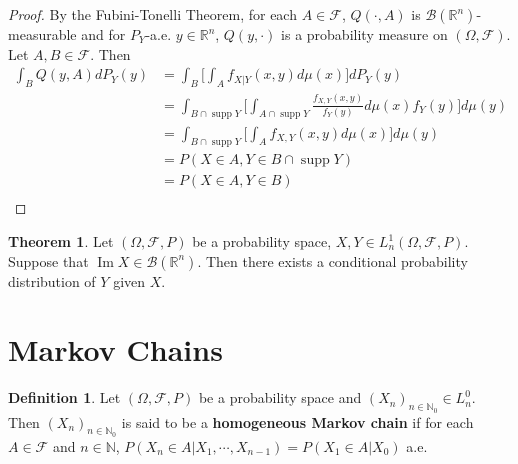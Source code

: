 \documentclass[12pt]{amsart}
\theoremstyle{definition}
\newtheorem{defn}[definition]{Definition}
\newtheorem{thm}[definition]{Theorem}
\newcommand{\Om}{\Omega}
\newcommand{\N}{\mathbb{N}}
\newcommand{\R}{\mathbb{R}}
\newcommand{\MB}{\mathcal{B}}
\newcommand{\MF}{\mathcal{F}}
\DeclareMathOperator{\Img}{Im}
\DeclareMathOperator{\supp}{supp}
\begin{document}
	\begin{proof}
	By the Fubini-Tonelli Theorem, for each $A \in \MF$, $Q(\cdot, A)$ is $\MB(\R^n)$-measurable and for $P_Y$-a.e. $y \in \R^n$, $Q(y, \cdot)$ is a probability measure on $(\Om, \MF)$. Let $A, B \in \MF$. Then 
	\begin{align*}
	\int_B Q(y, A) dP_Y(y)
	&= \int_B \bigg[ \int_A f_{X|Y}(x,y) d\mu(x) \bigg] dP_Y(y) \\
	&= \int_{B \cap \supp Y} \bigg[ \int_{A \cap \supp Y} \frac{f_{X,Y}(x,y)}{f_Y(y)} d\mu(x) f_Y(y) \bigg] d \mu(y) \\
	&= \int_{B \cap \supp Y}  \bigg[\int_A f_{X,Y}(x,y) d\mu(x) \bigg] d \mu(y) \\
	&= P(X \in A, Y \in B \cap \supp Y) \\
	&= P(X \in A, Y \in B) \\	
	\end{align*}
	\end{proof}
	
	\begin{thm}
	Let $(\Om, \MF, P)$ be a probability space, $X,Y \in L_n^1(\Om, \MF, P)$. Suppose that $\Img X \in \MB(\R^n)$. Then there exists a conditional probability distribution of $Y$ given $X$. 
	\end{thm}
	
	
	
	
	
	
	
	
	
	
	
	
	
	
	\newpage
	\section{Markov Chains}	

	
	\begin{defn}
	Let $(\Om, \MF, P)$ be a probability space and $(X_n)_{n \in \N_0} \in L_n^0$. Then $(X_n)_{n \in \N_0}$ is said to be a \textbf{homogeneous Markov chain} if for each $A \in \MF$ and $n \in \N$, $P(X_n \in A| X_1, \cdots, X_{n-1}) = P(X_1 \in A| X_{0})$ a.e. 
	\end{defn}
	
	
	
	
	
	
	
	
	
	
	
	
	
	
	
	
	
\end{document}
